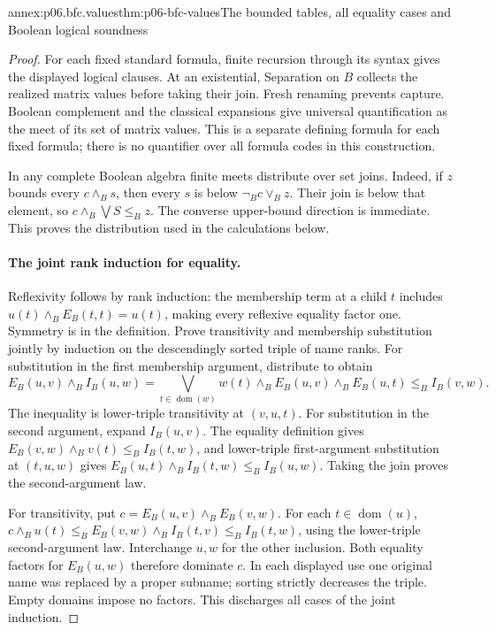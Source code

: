 \begin{annexitem}{annex:p06.bfc.values}{thm:p06-bfc-values}{The bounded tables, all equality cases and Boolean logical soundness}
\begin{proof}
For each fixed standard formula, finite recursion through its syntax
gives the displayed logical clauses. At an existential, Separation on
\(B\) collects the realized matrix values before taking their join.
Fresh renaming prevents capture. Boolean complement and the classical
expansions give universal quantification as the meet of its set of
matrix values. This is a separate defining formula for each fixed
formula; there is no quantifier over all formula codes in this construction.

In any complete Boolean algebra finite meets distribute over set joins.
Indeed, if \(z\) bounds every \(c\wedge_B s\), then every \(s\) is
below \(\neg_B c\vee_B z\). Their join is below that element, so
\(c\wedge_B\bigvee S\leq_B z\). The converse upper-bound direction
is immediate. This proves the distribution used in the calculations below.

\paragraph{The joint rank induction for equality.}
Reflexivity follows by rank induction: the membership term at a child
\(t\) includes \(u(t)\wedge_B E_B(t,t)=u(t)\), making every
reflexive equality factor one. Symmetry is in the definition.
Prove transitivity and membership substitution jointly by induction on
the descendingly sorted triple of name ranks. For substitution in the
first membership argument, distribute to obtain
\[
 E_B(u,v)\wedge_B I_B(u,w)
 =\bigvee_{t\in\operatorname{dom}(w)}
 w(t)\wedge_B E_B(u,v)\wedge_B E_B(u,t)
 \leq_B I_B(v,w).
\]
The inequality is lower-triple transitivity at \((v,u,t)\).
For substitution in the second argument, expand \(I_B(u,v)\).
The equality definition gives
\(E_B(v,w)\wedge_B v(t)\leq_B I_B(t,w)\), and lower-triple
first-argument substitution at \((t,u,w)\) gives
\(E_B(u,t)\wedge_B I_B(t,w)\leq_B I_B(u,w)\).
Taking the join proves the second-argument law.

For transitivity, put \(c=E_B(u,v)\wedge_B E_B(v,w)\).
For each \(t\in\operatorname{dom}(u)\),
\(c\wedge_B u(t)\leq_B E_B(v,w)\wedge_B I_B(t,v)
\leq_B I_B(t,w)\), using the lower-triple second-argument law.
Interchange \(u,w\) for the other inclusion. Both equality factors
for \(E_B(u,w)\) therefore dominate \(c\). In each displayed use
one original name was replaced by a proper subname; sorting strictly
decreases the triple. Empty domains impose no factors. This discharges
all cases of the joint induction.


\end{proof}
\end{annexitem}
